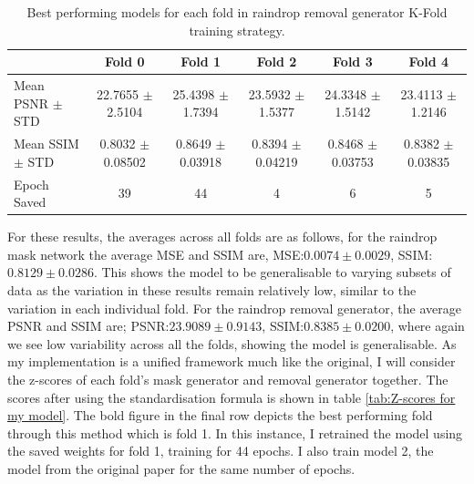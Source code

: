 \documentclass[11pt]{ociamthesis}  %
\begin{document}
\begin{table}[ht]
\centering
\begin{tabular}{|l|c|c|c|c|c|}
\hline
 & Fold 0 & Fold 1 & Fold 2 & Fold 3 & Fold 4 \\
\hline
\makecell{Mean PSNR $\pm$ \\ STD} & 
\makecell{22.7655 $\pm$ \\ 2.5104} & 
\makecell{25.4398 $\pm$ \\ 1.7394} & 
\makecell{23.5932 $\pm$ \\ 1.5377} & 
\makecell{24.3348 $\pm$ \\ 1.5142} & 
\makecell{23.4113 $\pm$ \\ 1.2146} \\
\hline
\makecell{Mean SSIM $\pm$ \\ STD} & 
\makecell{0.8032 $\pm$ \\ 0.08502} & 
\makecell{0.8649 $\pm$ \\ 0.03918} & 
\makecell{0.8394 $\pm$ \\ 0.04219} & 
\makecell{0.8468 $\pm$ \\ 0.03753} & 
\makecell{0.8382 $\pm$ \\ 0.03835} \\
\hline
Epoch Saved & 39 & 44 & 4 & 6 & 5 \\
\hline
\end{tabular}
\caption{Best performing models for each fold in raindrop removal generator K-Fold training strategy.}
\label{tab:Removal generator fold results}
\end{table}
For these results, the averages across all folds are as follows, for the raindrop mask network the average MSE and SSIM are, MSE:$0.0074 \pm 0.0029$, SSIM:$0.8129\pm 0.0286$. This shows the model to be generalisable to varying subsets of data as the variation in these results remain relatively low, similar to the variation in each individual fold. For the raindrop removal generator, the average PSNR and SSIM are; PSNR:$23.9089\pm 0.9143$, SSIM:$0.8385\pm 0.0200$, where again we see low variability across all the folds, showing the model is generalisable. As my implementation is a unified framework much like the original, I will consider the z-scores of each fold's mask generator and removal generator together. The scores after using the standardisation formula is shown in table \ref{tab:Z-scores for my model}. The bold figure in the final row depicts the best performing fold through this method which is fold 1. In this instance, I retrained the model using the saved weights for fold 1, training for 44 epochs. I also train model 2, the model from the original paper for the same number of epochs. 
\end{document}
